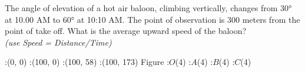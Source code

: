 
%
%
%
%
% 

\question[6] The angle of elevation of a hot air baloon, climbing vertically, changes from $\ang{30}$ at 10.00 AM to $\ang{60}$ at 10:10 AM. The point of observation is 300 meters from the point of take off. What is the average upward speed of the baloon? \\
\textit{(use Speed = Distance/Time)}

\ifprintanswers
	\begin{marginfigure}
		:(0, 0)
		:(100, 0)
		:(100, 58)
		:(100, 173)
		\figdrawbegin{}
			\figdrawline[1,2,3,4,1]
			\figdrawline[3,1]
		\figdrawend
		\figvisu{\figBoxA} {Figure}
		{
			:$O$(4)
			:$A$(4)
			:$B$(4)
			:$C$(4)
		}
		\centerline{\box\figBoxA}
	\end{marginfigure}
\fi 

